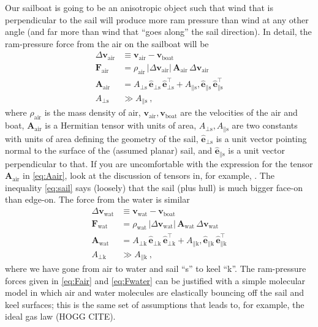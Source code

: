 \documentclass{article}
\renewcommand{\vec}[1]{\boldsymbol{#1}}
\newcommand{\uvec}{\vec{\hat{e}}}
\newcommand{\tensor}[1]{\mathbf{#1}}
\newcommand{\air}{\text{air}}
\newcommand{\water}{\text{wat}}
\newcommand{\boat}{\text{boat}}
\newcommand{\sail}{\text{s}}
\newcommand{\keel}{\text{k}}
\newcommand{\vair}{\vec{v}_\air}
\newcommand{\vwater}{\vec{v}_\water}
\newcommand{\vboat}{\vec{v}_\boat}
\begin{document}
Our sailboat is going to be an anisotropic object such that wind that is perpendicular to the sail will produce more ram pressure than wind at any other angle (and far more than wind that ``goes along'' the sail direction).
In detail, the ram-pressure force from the air on the sailboat will be
\begin{align}
    \Delta\vair &\equiv \vair-\vboat
    \\
    \vec{F}_\air &= \rho_\air\,|\Delta\vair|\,\tensor{A}_\air\,\Delta\vair \label{eq:Fair}
    \\
    \tensor{A}_\air &= A_{\perp\sail}\,\uvec_{\perp\sail}\,\uvec_{\perp\sail}^\top + A_{\parallel\sail},\uvec_{\parallel\sail}\,\uvec_{\parallel\sail}^\top \label{eq:Aair}
    \\
    A_{\perp\sail} &\gg A_{\parallel\sail} \label{eq:sail}
    ~,
\end{align}
where $\rho_\air$ is the mass density of air, $\vair,\vboat$ are the velocities of the air and boat, $\tensor{A}_\air$ is a Hermitian tensor with units of area, $A_{\perp\sail}, A_{\parallel\sail}$ are two constants with units of area defining the geometry of the sail, $\uvec_{\perp\sail}$ is a unit vector pointing normal to the surface of the (assumed planar) sail, and $\uvec_{\parallel\sail}$ is a unit vector perpendicular to that.
If you are uncomfortable with the expression for the tensor $\tensor{A}_\air$ in \eqref{eq:Aair}, look at the discussion of tensors in, for example, \cite{kusse}.
The inequality \eqref{eq:sail} says (loosely) that the sail (plus hull) is much bigger face-on than edge-on.
The force from the water is similar
\begin{align}
    \Delta\vwater &\equiv \vwater-\vboat
    \\
    \vec{F}_\water &= \rho_\water\,|\Delta\vwater|\,\tensor{A}_\water\,\Delta\vwater \label{eq:Fwater}
    \\
    \tensor{A}_\water &= A_{\perp\keel}\,\uvec_{\perp\keel}\,\uvec_{\perp\keel}^\top + A_{\parallel\keel},\uvec_{\parallel\keel}\,\uvec_{\parallel\keel}^\top
    \\
    A_{\perp\keel} &\gg A_{\parallel\keel} ~,
\end{align}
where we have gone from air to water and sail ``s'' to keel ``k''.
The ram-pressure forces given in \eqref{eq:Fair} and \eqref{eq:Fwater} can be justified with a simple molecular model in which air and water molecules are elastically bouncing off the sail and keel surfaces; this is the same set of assumptions that leads to, for example, the ideal gas law (HOGG CITE).
\end{document}
